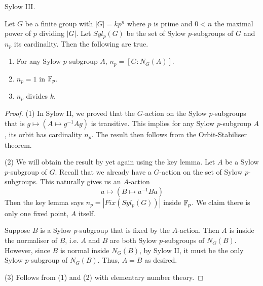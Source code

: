 \documentclass[../../book.tex]{subfiles}
\begin{document}
\begin{thm} Sylow III.
    
    Let $G$ be a finite group with $|G| = k p^n$ where $p$ is prime
    and $0 < n$ the maximal power of $p$ dividing $|G|$. 
    Let $Syl_p(G)$ be the set of Sylow $p$-subgroups of $G$ and $n_p$ its cardinality.
    Then the following are true. \begin{enumerate}
        \item For any Sylow $p$-subgroup $A$, $n_p = [ G : N_G(A)]$.  
        \item $n_p = 1$ in $\mathbb{F}_p$. 
        \item $n_p$ divides $k$. 
    \end{enumerate}
    
\end{thm}
\begin{proof}
    
    (1)
    In Sylow II, we proved that the $G$-action on the Sylow $p$-subgroups
    that is $g \mapsto (A \mapsto g^{-1} A g)$ is transitive. 
    This implies for any Sylow $p$-subgroup $A$, its orbit has cardinality $n_p$.
    The result then follows from the Orbit-Stabiliser theorem. 
    
    (2)
    We will obtain the result by yet again using the key lemma. 
    Let $A$ be a Sylow $p$-subgroup of $G$. 
    Recall that we already have a $G$-action on the set of Sylow $p$-subgroups.
    This naturally gives us an $A$-action \[
        a \mapsto (B \mapsto a^{-1} B a)
    \]
    Then the key lemma says $n_p = |Fix(Syl_p(G))|$ inside $\mathbb{F}_p$. 
    We claim there is only one fixed point, $A$ itself. 
    
    Suppose $B$ is a Sylow $p$-subgroup that is fixed by the $A$-action.
    Then $A$ is inside the normaliser of $B$,
    i.e. $A$ and $B$ are both Sylow $p$-subgroups of $N_G(B)$.
    However, since $B$ is normal inside $N_G(B)$, by Sylow II,
    it must be the only Sylow $p$-subgroup of $N_G(B)$. 
    Thus, $A = B$ as desired.
    
    (3)
    Follows from (1) and (2) with elementary number theory. 
    
\end{proof}
\end{document}
